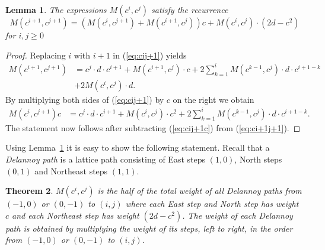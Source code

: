 \documentclass[reqno,12pt]{amsart}
\numberwithin{equation}{section}
\newtheorem{theorem}{Theorem}[section]
\newtheorem{lemma}[theorem]{Lemma}
\newcommand{\0}{\widehat{0}}
\newcommand{\1}{\widehat{1}}
\newcommand{\2}{\widehat{2}}
\begin{document}
\begin{lemma}
\label{lem:Mrec}  
The expressions $M(c^i,c^j)$ satisfy the recurrence
$$
M(c^{i+1},c^{j+1})=(M(c^{i},c^{j+1})+M(c^{i+1},c^{j}))c+M(c^i,c^j)\cdot
(2d-c^2)
$$
for $i,j\geq 0$
\end{lemma}  
\begin{proof}
Replacing $i$ with $i+1$ in (\ref{eq:cij+1}) yields
\begin{align}
\label{eq:ci+1j+1}  
  M(c^{i+1},c^{j+1})&=c^j\cdot d\cdot c^{i+1}+M(c^{i+1},c^j)\cdot c
  +2\sum_{k=1}^i M(c^{k-1},c^{j})\cdot d\cdot
  c^{i+1-k}\\
  &+2M(c^{i},c^{j})\cdot d. \nonumber
\end{align}
By multiplying both sides of (\ref{eq:cij+1}) by $c$ on the right we
obtain 
\begin{align}
\label{eq:cij+1c}
  M(c^i,c^{j+1})c&=c^j\cdot d\cdot c^{i+1}+M(c^i,c^j)\cdot c^2
  +2\sum_{k=1}^i M(c^{k-1},c^{j})\cdot d\cdot c^{i+1-k}.
\end{align}  
The statement now follows after subtracting (\ref{eq:cij+1c}) from
(\ref{eq:ci+1j+1}).
\end{proof}  
Using Lemma~\ref{lem:Mrec} it is easy to show the following
statement. Recall that a {\em Delannoy path} is a lattice path
consisting of East steps $(1,0)$, North steps $(0,1)$ and Northeast
steps $(1,1)$.
\begin{theorem}
\label{thm:mcc}  
$M(c^i,c^j)$ is the half of the total weight of all Delannoy paths from
  $(-1,0)$ or $(0,-1)$ to $(i,j)$ where each East step and North step
  has weight $c$ and each Northeast step has weight $(2d-c^2)$. The
  weight of each 
  Delannoy path is obtained by multiplying the weight of its steps, left
  to right, in the order from $(-1,0)$ or $(0,-1)$ to $(i,j)$.   
\end{theorem}  
\end{document}
